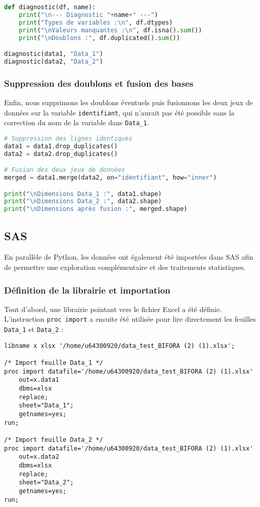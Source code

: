 \begin{lstlisting}[language=Python, caption=Diagnostic des bases]
def diagnostic(df, name):
    print("\n--- Diagnostic "+name+" ---")
    print("Types de variables :\n", df.dtypes)
    print("\nValeurs manquantes :\n", df.isna().sum())
    print("\nDoublons :", df.duplicated().sum())

diagnostic(data1, "Data_1")
diagnostic(data2, "Data_2")
\end{lstlisting}

\subsubsection{Suppression des doublons et fusion des bases}
Enfin, nous supprimons les doublons éventuels puis fusionnons les deux jeux de données sur la variable \texttt{identifiant}, 
qui n'aurait pas été possible sans la correction du nom de la variable dans \texttt{Data\_1}.

\begin{lstlisting}[language=Python, caption=Nettoyage et fusion des données]
# Suppression des lignes identiques
data1 = data1.drop_duplicates() 
data2 = data2.drop_duplicates()

# Fusion des deux jeux de données
merged = data1.merge(data2, on="identifiant", how="inner")

print("\nDimensions Data_1 :", data1.shape)
print("\nDimensions Data_2 :", data2.shape)
print("\nDimensions après fusion :", merged.shape)
\end{lstlisting}

\subsection{SAS}

En parallèle de Python, les données ont également été importées dans SAS afin de permettre une exploration complémentaire et des traitements statistiques. 

\subsubsection{Définition de la librairie et importation}
Tout d'abord, une librairie pointant vers le fichier Excel a été définie. L'instruction \texttt{proc import} a ensuite été utilisée pour lire directement les feuilles \texttt{Data\_1} et \texttt{Data\_2} :

\begin{lstlisting}[caption=Importation des données dans SAS]
libname x xlsx '/home/u64300920/data_test_BIFORA (2) (1).xlsx';

/* Import feuille Data_1 */
proc import datafile='/home/u64300920/data_test_BIFORA (2) (1).xlsx'
    out=x.data1
    dbms=xlsx
    replace;
    sheet="Data_1";
    getnames=yes;
run;

/* Import feuille Data_2 */
proc import datafile='/home/u64300920/data_test_BIFORA (2) (1).xlsx'
    out=x.data2
    dbms=xlsx
    replace;
    sheet="Data_2";
    getnames=yes;
run;
\end{lstlisting}

